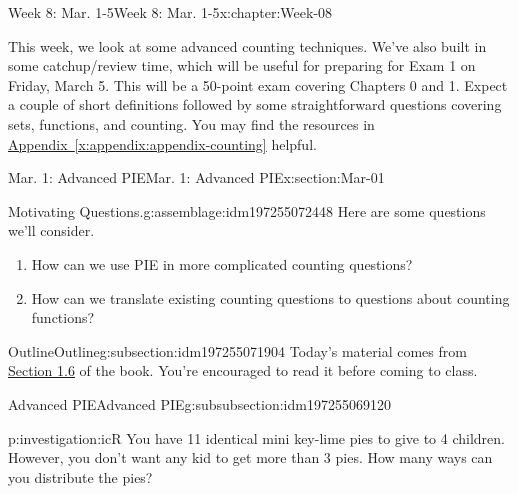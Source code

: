 \documentclass[oneside,10pt,]{book}
\newcommand{\xreffont}{\relax}
\numberwithin{equation}{section}
\begin{document}
\begin{chapterptx}{Week 8: Mar. 1-5}{}{Week 8: Mar. 1-5}{}{}{x:chapter:Week-08}
\begin{introduction}{}%
This week, we look at some advanced counting techniques. We've also built in some catchup\slash{}review time, which will be useful for preparing for Exam 1 on Friday, March 5. This will be a 50-point exam covering Chapters 0 and 1. Expect a couple of short definitions followed by some straightforward questions covering sets, functions, and counting. You may find the resources in \hyperref[x:appendix:appendix-counting]{Appendix~{\xreffont\ref{x:appendix:appendix-counting}}} helpful.%
\end{introduction}%
%
%
\typeout{************************************************}
\typeout{************************************************}
%
\begin{sectionptx}{Mar. 1: Advanced PIE}{}{Mar. 1: Advanced PIE}{}{}{x:section:Mar-01}
\begin{introduction}{}%
\begin{assemblage}{Motivating Questions.}{g:assemblage:idm197255072448}%
Here are some questions we'll consider. %
\begin{enumerate}
\item{}How can we use PIE in more complicated counting questions?%
\item{}How can we translate existing counting questions to questions about counting functions?%
\end{enumerate}
%
\end{assemblage}
\end{introduction}%
%
%
\typeout{************************************************}
\typeout{************************************************}
%
\begin{subsectionptx}{Outline}{}{Outline}{}{}{g:subsection:idm197255071904}
Today's material comes from \href{http://discrete.openmathbooks.org/dmoi3/sec_advPIE.html}{Section 1.6} of the book. You're encouraged to read it before coming to class.%
%
%
\typeout{************************************************}
\typeout{************************************************}
%
\begin{subsubsectionptx}{Advanced PIE}{}{Advanced PIE}{}{}{g:subsubsection:idm197255069120}
\begin{investigation}{}{p:investigation:icR}%
You have 11 identical mini key-lime pies to give to 4 children. However, you don't want any kid to get more than 3 pies. How many ways can you distribute the pies?%

\end{investigation}
\end{subsubsectionptx}
\end{subsectionptx}
\end{sectionptx}
\end{chapterptx}
\end{document}

